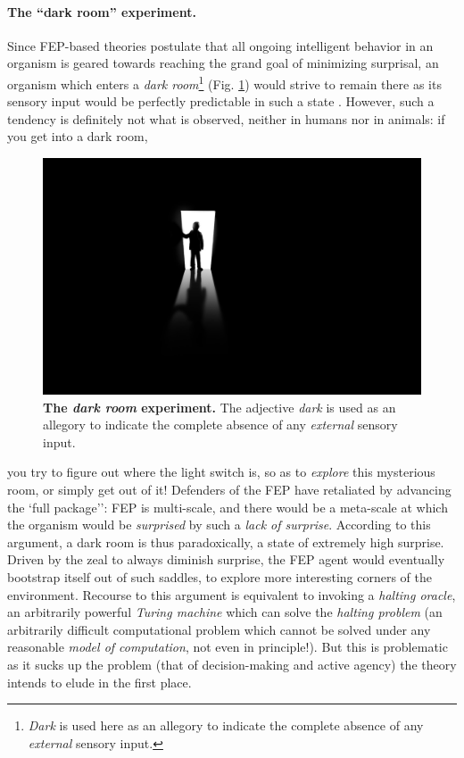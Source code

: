 \documentclass[10pt,letterpaper]{article}
\begin{document}
\paragraph{The ``dark room'' experiment.}
Since FEP-based theories \citep{friston2010free,fristonAIorRL} postulate that all ongoing intelligent behavior in an organism is geared towards reaching the grand goal of minimizing surprisal, an organism which enters a \textit{dark room}\footnote{\textit{Dark} is used here as an allegory to indicate the complete absence of any \textit{external} sensory input.} (Fig. \ref{fig:darkroom}) would strive to remain there as its sensory input would be perfectly predictable in such a state \citep{darkroom2012}.
However, such a tendency is definitely not what is observed, neither in humans nor in animals: if you get into a dark room,
\begin{figure}
  \centering
  \includegraphics[width=1.\linewidth]{darkroom.jpg}
  \caption{\textbf{The \textit{dark room} experiment.} The adjective \textit{dark} is used as an allegory to indicate the complete absence of any \textit{external} sensory input.}
  \label{fig:darkroom}
\end{figure}
you try to figure out where the light switch is, so as to \textit{explore} this mysterious room, or simply get out of it! Defenders of the FEP have retaliated by advancing the `full package''\citep{darkroom2012}: FEP is multi-scale, and there would be a meta-scale at which the organism would
be \textit{surprised} by such a \textit{lack of surprise}. According to this argument, a dark room is thus paradoxically, a state of extremely high surprise. Driven by the zeal to always diminish surprise, the FEP agent would eventually bootstrap itself out of such saddles, to explore more interesting corners of the environment. Recourse to this argument is equivalent to invoking a \textit{halting oracle}\citep{haltingoracle}, an arbitrarily powerful \textit{Turing machine} which can solve the \textit{halting problem} (an arbitrarily difficult computational problem which cannot be solved under any reasonable \textit{model of computation}, not even in principle!). But this is problematic as it sucks up the problem (that of decision-making and active agency) the theory intends to elude in the first place.
\end{document}
